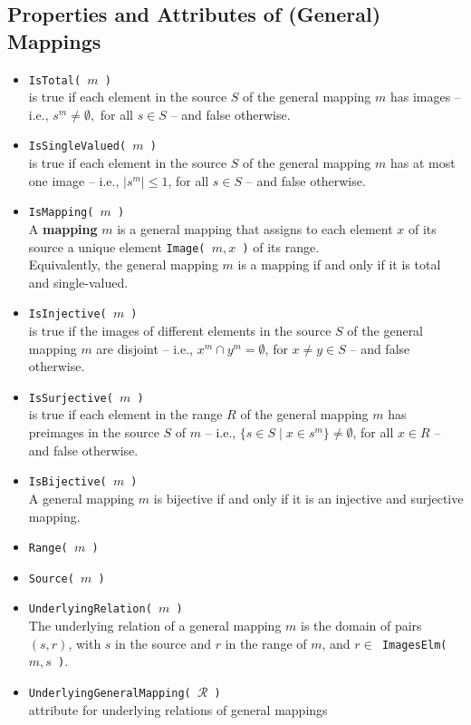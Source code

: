 \documentclass[11pt]{amsart}
\theoremstyle{plain}
\newcommand{\subsectionspace}{~\\[-6pt]}
\newcommand{\<}{\ensuremath{\langle}}
\renewcommand{\>}{\ensuremath{\rangle}}
\newcommand{\sR}{\ensuremath{\mathscr{R}}}
\renewcommand{\leq}{\ensuremath{\leqslant}}
\begin{document}
\subsection{Properties and Attributes of (General) Mappings}
\label{sec:properties-of-mappings}
\begin{itemize}
\item  {\tt IsTotal( $m$ )}\\
is true if each element in the source $S$ of the general mapping $m$ has images 
-- i.e., $s^{m} \neq \emptyset,$ for all $s \in S$ -- 
and false otherwise.
\item  {\tt IsSingleValued( $m$ )}\\
is true if each element in the source $S$ of the general mapping $m$ has at most
one image -- i.e., $|s^{m}| \leq 1$, for all $s \in S$ -- and false otherwise.
\item  {\tt IsMapping( $m$ )}\\
A {\bf mapping} $m$ is a general mapping that assigns to each element $x$ of
its source a unique element {\tt Image( $m, x$ )} of its range.
\\[4pt]
Equivalently, the general mapping $m$ is a mapping if and only if it is total
and single-valued.
\item {\tt IsInjective( $m$ )}\\
is true if the images of different elements in the source $S$ of the general mapping
$m$ are disjoint -- i.e., $x^m \cap y^m = \emptyset$, for $x \neq y \in S$ -- and false otherwise.
\item {\tt IsSurjective( $m$ )}\\
is true if each element in the range $R$ of the general mapping $m$ has preimages in
the source $S$ of $m$ -- i.e., $\{s \in  S \mid x \in s^m \} \neq \emptyset$, for all
$x \in R$ -- and false otherwise.
\item {\tt IsBijective( $m$ )}\\
A general mapping $m$ is bijective if and only if it is an injective and surjective mapping.
\item {\tt Range( $m$ )}
\item {\tt Source( $m$ )}
\item {\tt UnderlyingRelation( $m$ )}\\
The underlying relation of a general mapping $m$ is the domain of pairs $(s, r)$,
with $s$ in the source and $r$ in the range of $m$, and 
{\tt $r \in $ ImagesElm( $m, s$ )}.
\item {\tt UnderlyingGeneralMapping( $\sR$ )}\\
attribute for underlying relations of general mappings
\end{itemize}
\subsectionspace
\end{document}
